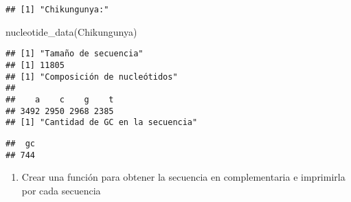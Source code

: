 \documentclass[
]{article}
\newenvironment{Shaded}{\begin{snugshade}}{\end{snugshade}}
\newcommand{\FunctionTok}[1]{\textcolor[rgb]{0.00,0.00,0.00}{#1}}
\newcommand{\NormalTok}[1]{#1}
\providecommand{\tightlist}{%
  \setlength{\itemsep}{0pt}\setlength{\parskip}{0pt}}
\begin{document}
\begin{verbatim}
## [1] "Chikungunya:"
\end{verbatim}

\begin{Shaded}
\begin{Highlighting}[]
\FunctionTok{nucleotide\_data}\NormalTok{(Chikungunya)}
\end{Highlighting}
\end{Shaded}

\begin{verbatim}
## [1] "Tamaño de secuencia"
## [1] 11805
## [1] "Composición de nucleótidos"
## 
##    a    c    g    t 
## 3492 2950 2968 2385 
## [1] "Cantidad de GC en la secuencia"
\end{verbatim}

\begin{verbatim}
##  gc 
## 744
\end{verbatim}

\begin{enumerate}
\def\labelenumi{\arabic{enumi}.}
\setcounter{enumi}{3}
\tightlist
\item
  Crear una función para obtener la secuencia en complementaria e
  imprimirla por cada secuencia
\end{enumerate}
\end{document}
